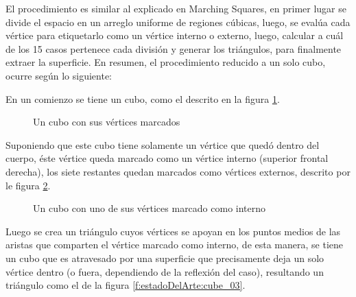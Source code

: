 El procedimiento es similar al explicado en Marching Squares, en primer lugar se divide el
espacio en un arreglo uniforme de regiones cúbicas, luego, se evalúa cada vértice para etiquetarlo como un vértice interno o externo, luego, calcular a cuál de los 15 casos pertenece cada división y generar los triángulos, para finalmente extraer la superficie.
En resumen, el procedimiento reducido a un solo cubo, ocurre según lo siguiente:

En un comienzo se tiene un cubo, como el descrito en la figura \ref{f:estadoDelArte:cube_01}.

\begin{figure}[hbp]
\centering
\caption{Un cubo con sus vértices marcados}
\label{f:estadoDelArte:cube_01}
\end{figure}

Suponiendo que este cubo tiene solamente un vértice que quedó dentro del cuerpo, éste
vértice queda marcado como un vértice interno (superior frontal derecha), los siete restantes quedan marcados
como vértices externos, descrito por le figura \ref{f:estadoDelArte:cube_02}.

\begin{figure}[hbp]
\centering
\caption{Un cubo con uno de sus vértices marcado como interno}
\label{f:estadoDelArte:cube_02}
\end{figure}

Luego se crea un triángulo cuyos vértices se apoyan en los puntos medios de las aristas
que comparten el vértice marcado como interno, de esta manera, se tiene un cubo que es
atravesado por una superficie que precisamente deja un solo vértice dentro (o fuera, dependiendo
de la reflexión del caso), resultando un triángulo como el de la figura \ref{f:estadoDelArte:cube_03}.

